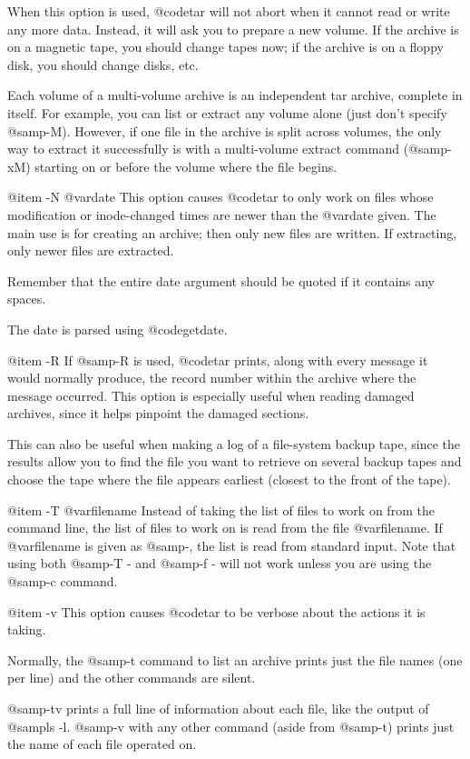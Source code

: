 When this option is used, @code{tar} will not abort when it cannot
read or write any more data.  Instead, it will ask you to prepare a
new volume.  If the archive is on a magnetic tape, you should change
tapes now; if the archive is on a floppy disk, you should change
disks, etc.

Each volume of a multi-volume archive is an independent tar archive,
complete in itself.  For example, you can list or extract any volume
alone (just don't specify @samp{-M}).  However, if one file in the
archive is split across volumes, the only way to extract it
successfully is with a multi-volume extract command (@samp{-xM})
starting on or before the volume where the file begins.

@item -N @var{date}
This option causes @code{tar} to only work on files whose modification
or inode-changed times are newer than the @var{date} given.  The main
use is for creating an archive; then only new files are written.  If
extracting, only newer files are extracted.

Remember that the entire date argument should be quoted if it contains
any spaces.

The date is parsed using @code{getdate}.

@item -R
If @samp{-R} is used, @code{tar} prints, along with every message it
would normally produce, the record number within the archive where
the message occurred.  This option is especially useful when reading
damaged archives, since it helps pinpoint the damaged sections.

This can also be useful when making a log of a file-system backup tape,
since the results allow you to find the file you want to retrieve
on several backup tapes and choose the tape where the file appears
earliest (closest to the front of the tape).

@item -T @var{filename}
Instead of taking the list of files to work on from the command
line, the list of files to work on is read from the file
@var{filename}.  If @var{filename} is given as @samp{-}, the list is
read from standard input.  Note that using both @samp{-T -} and
@samp{-f -} will not work unless you are using the @samp{-c} command.

@item -v
This option causes @code{tar} to be verbose about the actions it is
taking.

Normally, the @samp{-t} command to list an archive prints
just the file names (one per line) and the other commands are silent.

@samp{-tv} prints a full line of information about each file, like the
output of @samp{ls -l}.  @samp{-v} with any other command (aside from
@samp{-t}) prints just the name of each file operated on.

